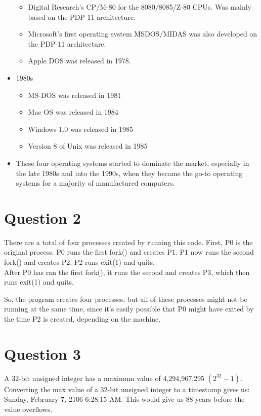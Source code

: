 \documentclass[12pt]{article}
\begin{document}
\begin{itemize}
	\begin{itemize}
		\item Digital Research's CP/M-80 for the 8080/8085/Z-80 CPUs. Was mainly based on the PDP-11 architecture.
		\item Microsoft's first operating system MSDOS/MIDAS was also developed on the PDP-11 architecture.
		\item Apple DOS was released in 1978.
	\end{itemize}
 	\item 1980s
 	\begin{itemize}
 		\item MS-DOS was released in 1981
 		\item Mac OS was released in 1984
 		\item Windows 1.0 was released in 1985
 		\item Version 8 of Unix was released in 1985
 	\end{itemize}
	\item These four operating systems started to dominate the market, especially in the late 1980s and into the 1990s, when they became the go-to operating systems for a majority of manufactured computers.
  \end{itemize}


  \section*{Question 2}
  
  There are a total of four processes created by running this code.
  First, P0 is the original process. P0 runs the first fork() and creates P1. P1 now runs the second fork() and creates P2. P2 runs exit(1) and quits.\\
  After P0 has ran the first fork(), it runs the second and creates P3, which then runs exit(1) and quits.
  
  So, the program creates four processes, but all of these processes might not be running at the same time, since it's easily possible that P0 might have exited by the time P2 is created, depending on the machine.
  
  
  \section*{Question 3}
  A 32-bit unsigned integer has a maximum value of 4,294,967,295 $(2^{32}-1)$. Converting the max value of a 32-bit unsigned integer to a timestamp gives us: Sunday, February 7, 2106 6:28:15 AM. This would give us 88 years before the value overflows. 
  
\end{document}
